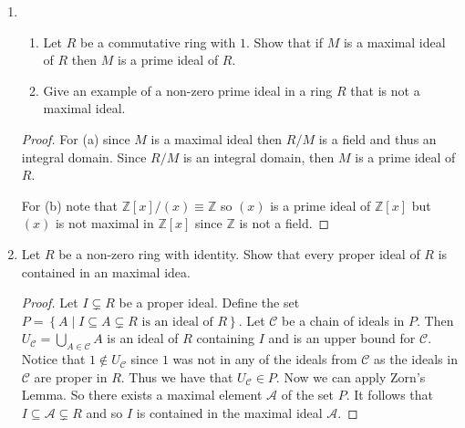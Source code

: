 \documentclass{article}
\theoremstyle{definition}
\newcommand{\Z}{\mathbb{Z}}
\newcommand{\set}[1]{\left\{#1\right\}}
\begin{document}
\begin{enumerate}
\begin{proof}
                Now suppose that $R/P$ is an integral domain. Suppose $A$ and $B$ are ideals such that $AB=0$. Then pick $a_1\in A$. Then, since $R/P$ is an integral domain, we have $a_1b_i=0$ for all $b_i\in B$ or $a_1=0$. Continuing in this way, we must have either $A=0$ or $B=0$. Thus $R/P$ is prime so $P$ is a prime ideal
            \end{proof}

            \item
                \begin{enumerate}
                    \item Let $R$ be a commutative ring with $1$. Show that if $M$ is a maximal ideal of $R$ then $M$ is a prime ideal of $R$.
                    \item Give an example of a non-zero prime ideal in a ring $R$ that is not a maximal ideal.
                \end{enumerate}

            \begin{proof}
                For (a) since $M$ is a maximal ideal then $R/M$ is a field and thus an integral domain. Since $R/M$ is an integral domain, then $M$ is a prime ideal of $R$.

                For (b) note that $\Z[x]/(x) \equiv \Z$ so $(x)$ is a prime ideal of $\Z[x]$ but $(x)$ is not maximal in $\Z[x]$ since $\Z$ is not a field.
            \end{proof}
            
            \item Let $R$ be a non-zero ring with identity. Show that every proper ideal of $R$ is contained in an maximal idea. 
            
            \begin{proof}
                Let $I \subsetneq R$ be a proper ideal. Define the set $P=\set{A \mid I \subseteq A\subsetneq R \text{ is an ideal of }R}$. Let $\mathcal{C}$ be a chain of ideals in $P$. Then $U_\mathcal{C}=\bigcup _{A\in \mathcal{C}}A$ is an ideal of $R$ containing $I$ and is an upper bound for $\mathcal{C}$. Notice that $1\notin U_\mathcal{C}$ since $1$ was not in any of the ideals from $\mathcal{C}$ as the ideals in $\mathcal{C}$ are proper in $R$. Thus we have that $U_\mathcal{C}\in P$. Now we can apply Zorn's Lemma. So there exists a maximal element $\mathscr{A}$ of the set $P$. It follows that $I\subseteq \mathscr{A}\subsetneq R$ and so $I$ is contained in the maximal ideal $\mathscr{A}$.
                

\end{proof}
\end{enumerate}
\end{document}
